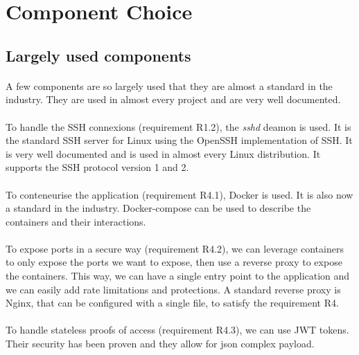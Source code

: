 \newpage
\section{Component Choice}

\subsection{Largely used components}

\paragraph{}
A few components are so largely used that they are almost a standard in the industry. They are used in almost every project and are very well documented. 

\paragraph{}
To handle the SSH connexions (requirement R1.2), the \textit{sshd} deamon is used. It is the standard SSH server for Linux using the OpenSSH implementation of SSH. It is very well documented and is used in almost every Linux distribution. It supports the SSH protocol version 1 and 2. 

\paragraph{}
To conteneurise the application (requirement R4.1), Docker is used. It is also now a standard in the industry. Docker-compose can be used to describe the containers and their interactions. 

\paragraph{}
To expose ports in a secure way (requirement R4.2), we can leverage containers to only expose the ports we want to expose, then use a reverse proxy to expose the containers. This way, we can have a single entry point to the application and we can easily add rate limitations and protections. A standard reverse proxy is Nginx, that can be configured with a single file, to satisfy the requirement R4.

\paragraph{}
To handle stateless proofs of access (requirement R4.3), we can use JWT tokens. Their security has been proven and they allow for json complex payload.

